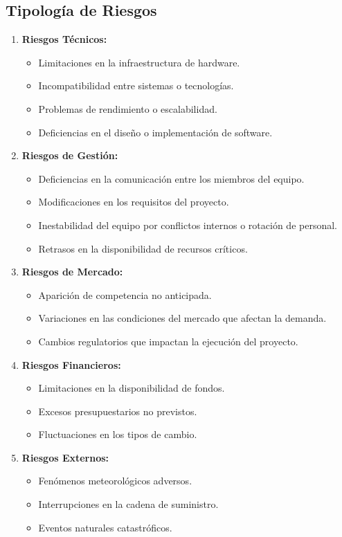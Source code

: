 \subsection*{Tipología de Riesgos} \label{subsec.tiprisks}
\begin{enumerate}
    \item \textbf{Riesgos Técnicos:}
    \begin{itemize}
        \item Limitaciones en la infraestructura de hardware.
        \item Incompatibilidad entre sistemas o tecnologías.
        \item Problemas de rendimiento o escalabilidad.        
        \item Deficiencias en el diseño o implementación de software.
    \end{itemize}
    
    \item \textbf{Riesgos de Gestión:}
    \begin{itemize}
        \item Deficiencias en la comunicación entre los miembros del equipo.
        \item Modificaciones en los requisitos del proyecto.        
        \item Inestabilidad del equipo por conflictos internos o rotación de personal.
        \item Retrasos en la disponibilidad de recursos críticos.

    \end{itemize}
    
    \item \textbf{Riesgos de Mercado:}
    \begin{itemize}
        \item Aparición de competencia no anticipada.
        \item Variaciones en las condiciones del mercado que afectan la demanda.
        \item Cambios regulatorios que impactan la ejecución del proyecto.
    \end{itemize}
    
    \item \textbf{Riesgos Financieros:}
    \begin{itemize}
        \item Limitaciones en la disponibilidad de fondos.
        \item Excesos presupuestarios no previstos.
        \item Fluctuaciones en los tipos de cambio.
    \end{itemize}
    
    \item \textbf{Riesgos Externos:}
    \begin{itemize}
        \item Fenómenos meteorológicos adversos.
        \item Interrupciones en la cadena de suministro.
        \item Eventos naturales catastróficos.
    \end{itemize}
\end{enumerate}

